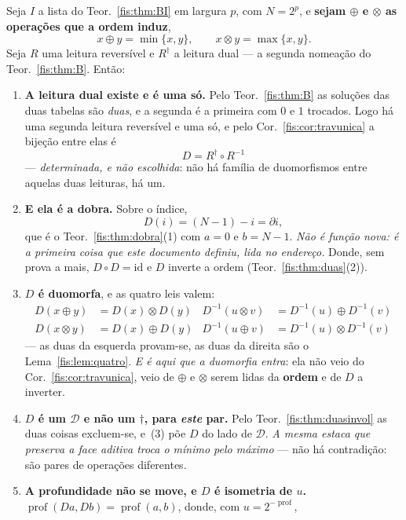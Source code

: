 \documentclass[livro.tex]{subfiles}
\begin{document}
\begin{teorema}\label{fis:thm:dual}
Seja $I$ a lista do Teor.~\ref{fis:thm:BI} em largura $p$, com $N=2^{p}$, e
\textbf{sejam $\oplus$ e $\otimes$ as operações que a ordem induz},
\[
x\oplus y=\min\{x,y\},\qquad x\otimes y=\max\{x,y\} .
\]
Seja $R$ uma leitura reversível e $R^{\dagger}$ a leitura dual --- a segunda
nomeação do Teor.~\ref{fis:thm:B}. Então:
\begin{enumerate}\itemsep3pt
\item[(1)] \textbf{A leitura dual existe e é uma só.} Pelo
Teor.~\ref{fis:thm:B} as soluções das duas tabelas são \emph{duas}, e a segunda é
a primeira com $0$ e $1$ trocados. Logo há uma segunda leitura reversível e uma
só, e pelo Cor.~\ref{fis:cor:travunica} a bijeção entre elas é
\[
\boxed{\;D=R^{\dagger}\circ R^{-1}\;}
\]
--- \emph{determinada, e não escolhida}: não há família de duomorfismos entre
aquelas duas leituras, há um.
\item[(2)] \textbf{E ela é a dobra.} Sobre o índice,
\[
D(i)=(N-1)-i=\partial i ,
\]
que é o Teor.~\ref{fis:thm:dobra}(1) com $a=0$ e $b=N-1$. \emph{Não é função nova: é a
primeira coisa que este documento definiu, lida no endereço.} Donde, sem prova a
mais, $D\circ D=\mathrm{id}$ e $D$ inverte a ordem
(Teor.~\ref{fis:thm:duas}(2)).
\item[(3)] \textbf{$D$ é duomorfa}, e as quatro leis valem:
\[
\boxed{
\begin{aligned}
D(x\oplus y)&=D(x)\otimes D(y) & D^{-1}(u\otimes v)&=D^{-1}(u)\oplus D^{-1}(v)\\
D(x\otimes y)&=D(x)\oplus D(y) & D^{-1}(u\oplus v)&=D^{-1}(u)\otimes D^{-1}(v)
\end{aligned}}
\]
--- as duas da esquerda provam-se, as duas da direita são o
Lema~\ref{fis:lem:quatro}. \emph{E é aqui que a duomorfia entra}: ela não veio do
Cor.~\ref{fis:cor:travunica}, veio de $\oplus$ e $\otimes$ serem lidas da
\textbf{ordem} e de $D$ a inverter.
\item[(4)] \textbf{$D$ é um $\mathcal{D}$ e não um $\dagger$, para \emph{este}
par.} Pelo Teor.~\ref{fis:thm:duasinvol} as duas coisas excluem-se, e~(3) põe $D$
do lado de $\mathcal{D}$. \emph{A mesma estaca que preserva a face aditiva troca
o mínimo pelo máximo} --- não há contradição: são pares de operações diferentes.
\item[(5)] \textbf{A profundidade não se move, e $D$ é isometria de $u$.}
$\operatorname{prof}(Da,Db)=\operatorname{prof}(a,b)$, donde, com
$u=2^{-\operatorname{prof}}$,

\end{enumerate}
\end{teorema}
\end{document}
